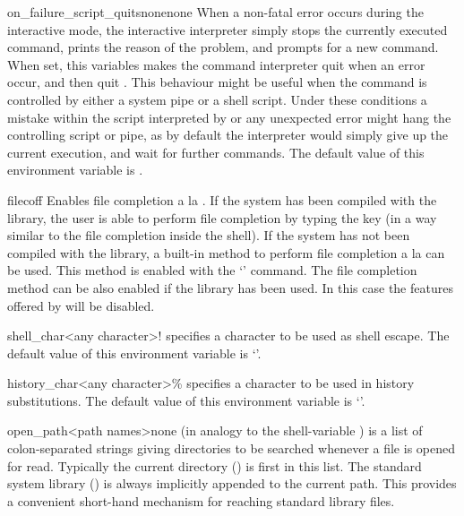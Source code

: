 \begin{nusmvVar} {on\_failure\_script\_quits}{none}{none}
When a non-fatal error occurs during the interactive mode, the
interactive interpreter simply stops the currently executed command,
prints the reason of the problem, and prompts for a new command.  When
set, this variables makes the command interpreter quit when an error
occur, and then quit \nusmv. This behaviour might be useful when the
command  is controlled by either a system pipe or
a shell script. Under these conditions a mistake within the script
interpreted by  or any unexpected error might
hang the controlling script or pipe, as by default the interpreter
would simply give up the current execution, and wait for further
commands.
The default value of this environment variable is .
\end{nusmvVar}


\begin{nusmvVar}{filec}{}{off}
Enables file completion a la \csh.  If the system has been compiled
with the \nusmvreadline library, the user is able to perform file
completion by typing the \tab key (in a way similar to the file
completion inside the \bash shell). If the system has not been
compiled with the \nusmvreadline library, a built-in method to perform
file completion a la \csh can be used. This method is enabled with
the `' command. The \csh file completion method can
be also enabled if the \nusmvreadline library has been used. In this case
the features offered by \nusmvreadline will be disabled.
\end{nusmvVar}

\begin{nusmvVar}{shell\_char}{<any character>}{!}
 specifies a character to be used as shell escape.
The default value of this environment variable is `\varvalue{!}'.
\end{nusmvVar}

\begin{nusmvVar} {history\_char}{<any character>}{\%}
 specifies a character to be used in history
substitutions.
The default value of this environment variable is `\varvalue{\%}'.
\end{nusmvVar}

\begin{nusmvVar} {open\_path}{<path names>}{none}
 (in analogy to the shell-variable ) is a
list of colon-separated strings giving directories to be searched
whenever a file is opened for read. Typically the current directory
() is first in this list. The standard system library
(\stdsyslib) \vindex{\stdsyslib}
is always implicitly appended to the current path. This provides a
convenient short-hand mechanism for reaching standard library files.
\end{nusmvVar}

